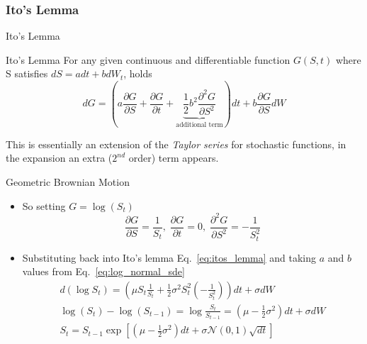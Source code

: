 \documentclass{beamer}
\begin{document}
\subsubsection{Ito's Lemma}
\begin{frame}{Ito's Lemma}
	\begin{block}{Ito's Lemma}
	For any given continuous and differentiable function $G(S,t)$ where S satisfies $dS=adt + bdW_t$, holds
	\begin{equation}
	dG = \left(a\frac{\partial G}{\partial S} + \frac{\partial G}{\partial t} + \underbrace{\frac{1}{2}b^2\frac{\partial^2 G}{\partial S^2}}_{\text{additional term}}\right)dt + b\frac{\partial G}{\partial S} dW
	\label{eq:itos_lemma}
	\end{equation}
	\end{block}

	This is essentially an extension of the \emph{Taylor series} for stochastic functions, in the expansion an extra ($2^{nd}$ order) term appears.
\end{frame}

\begin{frame}{Geometric Brownian Motion}
	\begin{itemize}
		\item So setting $G=\log(S_t)$ 
		\begin{equation*}
			\frac{\partial G}{\partial S}=\frac{1}{S_t},\;\frac{\partial G}{\partial t}=0,\;\frac{\partial^2 G}{\partial S^2}=-\frac{1}{S_t^2}
		\end{equation*}
		\item Substituting back into Ito's lemma Eq.~\ref{eq:itos_lemma} and taking $a$ and $b$ values from Eq.~\ref{eq:log_normal_sde}
		\begin{equation}
			\begin{gathered}
			d(\log S_t) = \left(\mu S_t\frac{1}{S_t} + \frac{1}{2}\sigma^2S_t^2\left(-\frac{1}{S_t^2}\right)\right)dt + \sigma dW \\
			\log(S_t) - \log(S_{t-1}) = \log\frac{S_t}{S_{t-1}}=\left(\mu - \frac{1}{2}\sigma^2\right)dt + \sigma dW \\
			S_t = S_{t-1}\exp\left[\left(\mu-\frac{1}{2}\sigma^2\right)dt + \sigma\mathcal{N}(0,1)\sqrt{dt}\right] 
			\end{gathered}
		\end{equation}
	\end{itemize}
\end{frame}
\end{document}
